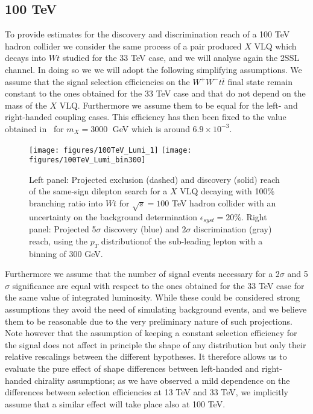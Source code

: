 \documentclass[a4paper]{article}
\begin{document}
\subsection{100 TeV}

To provide estimates for the discovery and discrimination reach of a 100 TeV hadron collider we consider the same process of a pair produced $X$ VLQ which decays into $Wt$ studied for the 33 TeV case, and we will analyse again the 2SSL channel. 
%
In doing so we we will adopt the following simplifying assumptions. We assume that the signal selection efficiencies on the $W^+W^- t \bar t$ final state remain constant to the ones obtained for the 33 TeV case and that do not depend on the mass of the $X$ VLQ. Furthermore we assume them to be equal for the left- and right-handed coupling cases. This efficiency has then been fixed to the value obtained in~\cite{Avetisyan:2013rca} for $m_X=3000\;$ GeV which is around $6.9 \times 10^{-3}$.
\begin{figure}[!htbp]
\centering
\texttt{[image: figures/100TeV\_Lumi\_1]}\hfill
\texttt{[image: figures/100TeV\_Lumi\_bin300]}
\caption{\label{fig:100Lumi}Left panel: Projected exclusion (dashed) and discovery (solid) reach of the same-sign dilepton search for a $X$ VLQ decaying with 100\% branching ratio into $Wt$ for $\sqrt{s}=100$ TeV hadron collider with an uncertainty on the background determination $\epsilon_{syst}=20\%$. Right panel: Projected 5$\sigma$ discovery (blue) and $2\sigma$ discrimination (gray) reach, using the $p_T$ distributionof the sub-leading lepton with a binning of 300 GeV.}
\end{figure}
Furthermore we assume that the number of signal events necessary for a 2$\sigma$ and 5$\sigma$ significance are equal with respect to the ones obtained for the 33 TeV case for the same value of integrated luminosity. While these could be considered strong assumptions they avoid the need of simulating background events, and we believe them to be reasonable due to the very preliminary nature of such projections. Note however that the assumption of keeping a constant selection efficiency for the signal does not affect in principle the shape of any distribution but only their relative rescalings between the different hypotheses.
It therefore allows us to evaluate the pure effect of shape differences between left-handed and right-handed chirality assumptions; as we have observed a mild dependence on the differences between selection efficiencies at 13 TeV and 33 TeV, we implicitly assume that a similar effect will take place also at 100 TeV.
\end{document}
